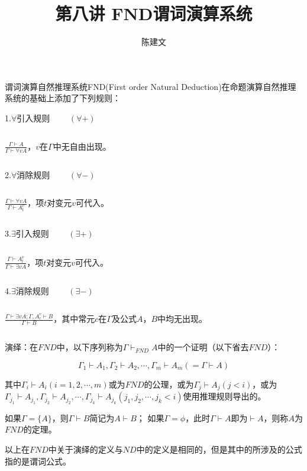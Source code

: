 \documentclass{article}
\begin{document}
\begin{CJK*}{UTF8}{gbsn}
  \title{第八讲 FND谓词演算系统}
  \author{陈建文}
  \maketitle

  谓词演算自然推理系统FND(First order Natural Deduction)在命题演算自然推理系统的基础上添加了下列规则：
  
  1.$\forall$引入规则 $\qquad(\forall +)$

  $\quad$

  {\Large$\frac{\Gamma \vdash A}{\Gamma \vdash \forall v A}$}，$v$在$\Gamma$中无自由出现。

$\quad$

  2.$\forall$消除规则 $\qquad(\forall -)$

  $\quad$

  {\Large$\frac{\Gamma \vdash \forall v A}{\Gamma \vdash A_t^v}$}，项$t$对变元$v$可代入。
 
  $\quad$

  3.$\exists$引入规则 $\qquad(\exists +)$

  $\quad$

  {\Large$\frac{\Gamma \vdash A_t^v}{\Gamma \vdash \exists v A}$}，项$t$对变元$v$可代入。
  
  $\quad$

  4.$\exists$消除规则 $\qquad(\exists -)$

  $\quad$

  {\Large$\frac{\Gamma \vdash \exists vA; \Gamma, A_c^v\vdash B}{\Gamma \vdash B}$}，其中常元$c$在$\Gamma$及公式$A$，$B$中均无出现。
 
  $\quad$

  演绎：在$FND$中，以下序列称为$\Gamma\vdash_{FND}A$中的一个证明（以下省去$FND$）：

  \[\Gamma_1\vdash A_1,\Gamma_2\vdash A_2,\cdots,\Gamma_m\vdash A_m(=\Gamma\vdash A)\]

  其中$\Gamma_i\vdash A_i(i=1,2,\cdots,m)$或为$FND$的公理，或为$\Gamma_j\vdash A_j(j<i)$，或为$\Gamma_{j_1}\vdash A_{j_1},\Gamma_{j_2}\vdash A_{j_2},\cdots, \Gamma_{j_k}\vdash A_{j_k}(j_1,j_2,\cdots, j_k<i)$使用推理规则导出的。


  如果$\Gamma=\{A\}$，则$\Gamma\vdash B$简记为$A\vdash B$；
  如果$\Gamma=\phi$，此时$\Gamma\vdash A$即为$\vdash A$，则称$A$为$FND$的定理。

以上在$FND$中关于演绎的定义与$ND$中的定义是相同的，但是其中的所涉及的公式指的是谓词公式。



\end{CJK*}
\end{document}
